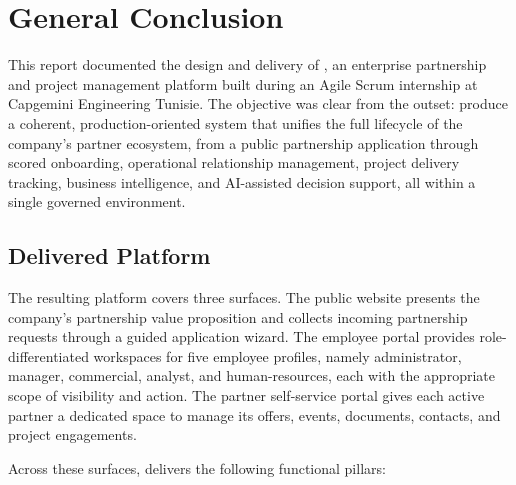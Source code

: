 \chapter*{General Conclusion}

This report documented the design and delivery of \projectname{}, an enterprise partnership and project management platform built during an Agile Scrum internship at Capgemini Engineering Tunisie. The objective was clear from the outset: produce a coherent, production-oriented system that unifies the full lifecycle of the company's partner ecosystem, from a public partnership application through scored onboarding, operational relationship management, project delivery tracking, business intelligence, and AI-assisted decision support, all within a single governed environment.

\section*{Delivered Platform}

The resulting platform covers three surfaces. The public website presents the company's partnership value proposition and collects incoming partnership requests through a guided application wizard. The employee portal provides role-differentiated workspaces for five employee profiles, namely administrator, manager, commercial, analyst, and human-resources, each with the appropriate scope of visibility and action. The partner self-service portal gives each active partner a dedicated space to manage its offers, events, documents, contacts, and project engagements.

Across these surfaces, \projectname{} delivers the following functional pillars:

